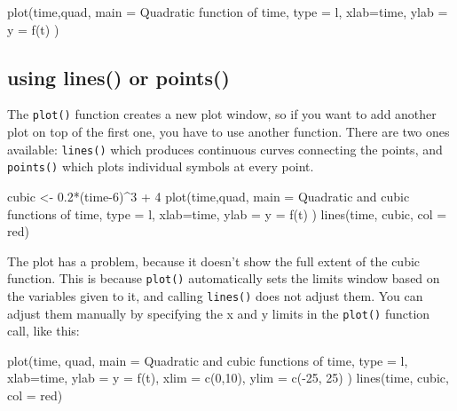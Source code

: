 \documentclass[
  letterpaper,
  DIV=11,
  numbers=noendperiod]{scrreprt}
\newenvironment{Shaded}{\begin{snugshade}}{\end{snugshade}}
\newcommand{\NormalTok}[1]{\textcolor[rgb]{0.00,0.23,0.31}{#1}}
\begin{document}
\begin{Shaded}
\begin{Highlighting}[]
\NormalTok{plot(time,quad, main = \textquotesingle{}Quadratic function of time\textquotesingle{}, type = \textquotesingle{}l\textquotesingle{}, xlab=\textquotesingle{}time\textquotesingle{}, ylab = \textquotesingle{}y = f(t)\textquotesingle{} )}
\end{Highlighting}
\end{Shaded}

\hypertarget{using-lines-or-points}{%
\subsection*{using lines() or points()}\label{using-lines-or-points}}

The \texttt{plot()} function creates a new plot window, so if you want
to add another plot on top of the first one, you have to use another
function. There are two ones available: \texttt{lines()} which produces
continuous curves connecting the points, and \texttt{points()} which
plots individual symbols at every point.

\begin{Shaded}
\begin{Highlighting}[]
\NormalTok{cubic \textless{}{-} 0.2*(time{-}6)\^{}3 + 4}
\NormalTok{plot(time,quad, main = \textquotesingle{}Quadratic and cubic functions of time\textquotesingle{}, type = \textquotesingle{}l\textquotesingle{}, xlab=\textquotesingle{}time\textquotesingle{}, ylab = \textquotesingle{}y = f(t)\textquotesingle{} )}
\NormalTok{lines(time, cubic, col = \textquotesingle{}red\textquotesingle{})}
\end{Highlighting}
\end{Shaded}

The plot has a problem, because it doesn't show the full extent of the
cubic function. This is because \texttt{plot()} automatically sets the
limits window based on the variables given to it, and calling
\texttt{lines()} does not adjust them. You can adjust them manually by
specifying the x and y limits in the \texttt{plot()} function call, like
this:

\begin{Shaded}
\begin{Highlighting}[]
\NormalTok{plot(time, quad, main = \textquotesingle{}Quadratic and cubic functions of time\textquotesingle{}, type = \textquotesingle{}l\textquotesingle{}, xlab=\textquotesingle{}time\textquotesingle{}, ylab = \textquotesingle{}y = f(t)\textquotesingle{}, xlim = c(0,10), ylim = c({-}25, 25) )}
\NormalTok{lines(time, cubic, col = \textquotesingle{}red\textquotesingle{})}
\end{Highlighting}
\end{Shaded}
\end{document}

